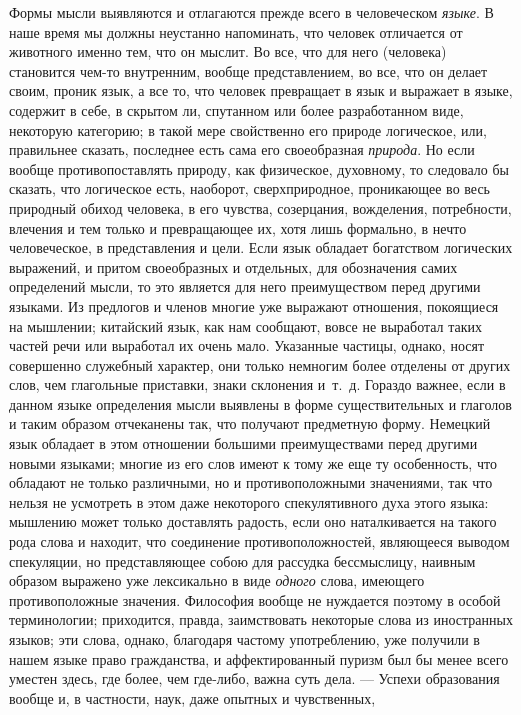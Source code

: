 Формы мысли выявляются и отлагаются прежде всего в человеческом
{\em языке}. В наше время мы должны неустанно
напоминать, что человек отличается от животного именно тем, что он мыслит.
Во все, что для него (человека) становится чем-то внутренним, вообще
представлением, во все, что он делает своим, проник язык, а все то, что
человек превращает в язык и выражает в языке, содержит в себе, в скрытом
ли, спутанном или более разработанном виде, некоторую категорию; в такой
мере свойственно его природе логическое, или, правильнее сказать, последнее
есть сама его своеобразная {\em природа}. Но если
вообще противопоставлять природу, как физическое, духовному, то следовало
бы сказать, что логическое есть, наоборот, сверхприродное, проникающее во
весь природный обиход человека, в его чувства, созерцания, вожделения,
потребности, влечения и тем только и превращающее их, хотя лишь формально,
в нечто человеческое, в представления и цели. Если язык обладает богатством
логических выражений, и притом своеобразных и отдельных, для обозначения
самих определений мысли, то это является для него преимуществом перед
другими языками. Из предлогов и членов многие уже выражают отношения,
покоящиеся на мышлении; китайский язык, как нам сообщают, вовсе не
выработал таких частей речи или выработал их очень мало. Указанные частицы,
однако, носят совершенно служебный характер, они только немногим более
отделены от других слов, чем глагольные приставки, знаки склонения и~т.~д.
Гораздо важнее, если в данном языке определения мысли выявлены в форме
существительных и глаголов и таким образом отчеканены так, что получают
предметную форму. Немецкий язык обладает в этом отношении большими
преимуществами перед другими новыми языками; многие из его слов имеют к
тому же еще ту особенность, что обладают не только различными, но и
противоположными значениями, так что нельзя не усмотреть в этом даже
некоторого спекулятивного духа этого языка: мышлению может только
доставлять радость, если оно наталкивается на такого рода слова и находит,
что соединение противоположностей, являющееся выводом спекуляции, но
представляющее собою для рассудка бессмыслицу, наивным образом выражено уже
лексикально в виде {\em одного} слова, имеющего
противоположные значения. Философия вообще не нуждается поэтому в особой
терминологии; приходится, правда, заимствовать некоторые слова из
иностранных языков; эти слова, однако, благодаря частому употреблению, уже
получили в нашем языке право гражданства, и аффектированный пуризм был бы
менее всего уместен здесь, где более, чем где-либо, важна суть дела. —
Успехи образования вообще и, в частности, наук, даже опытных и чувственных,
